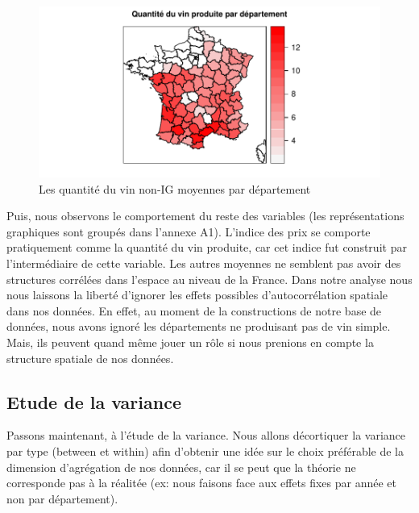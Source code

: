 \documentclass[11pt,]{article}
\begin{document}
\begin{figure}[!htbp]

{\centering \includegraphics{note2pres_files/figure-latex/unnamed-chunk-18-1} 

}

\caption{Les quantité du vin non-IG moyennes par département}\label{fig:unnamed-chunk-18}
\end{figure}

\FloatBarrier

Puis, nous observons le comportement du reste des variables (les
représentations graphiques sont groupés dans l'annexe A1). L'indice des
prix se comporte pratiquement comme la quantité du vin produite, car cet
indice fut construit par l'intermédiaire de cette variable. Les autres
moyennes ne semblent pas avoir des structures corrélées dans l'espace au
niveau de la France. Dans notre analyse nous nous laissons la liberté
d'ignorer les effets possibles d'autocorrélation spatiale dans nos
données. En effet, au moment de la constructions de notre base de
données, nous avons ignoré les départements ne produisant pas de vin
simple. Mais, ils peuvent quand même jouer un rôle si nous prenions en
compte la structure spatiale de nos données.

\hypertarget{etude-de-la-variance}{%
\subsection{Etude de la variance}\label{etude-de-la-variance}}

Passons maintenant, à l'étude de la variance. Nous allons décortiquer la
variance par type (between et within) afin d'obtenir une idée sur le
choix préférable de la dimension d'agrégation de nos données, car il se
peut que la théorie ne corresponde pas à la réalitée (ex: nous faisons
face aux effets fixes par année et non par département).
\end{document}
